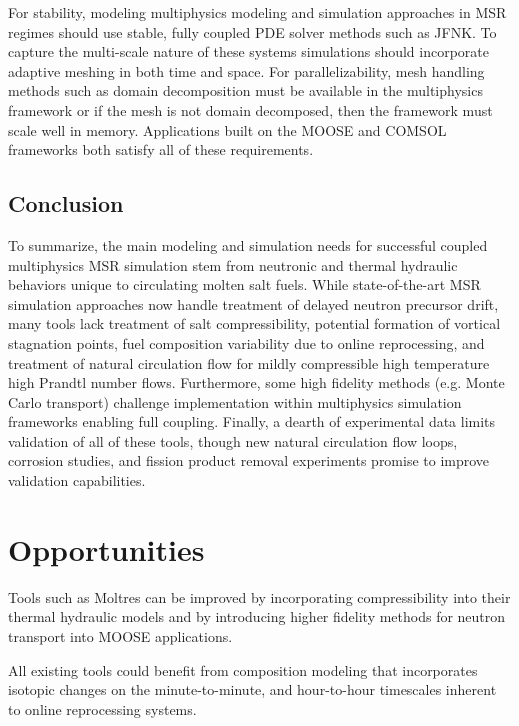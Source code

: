 For stability, modeling multiphysics modeling and simulation approaches in 
\gls{MSR} regimes should use stable, fully coupled 
\gls{PDE} solver methods such as \gls{JFNK}. To capture the multi-scale nature 
of these systems simulations should incorporate adaptive meshing in 
both time and space.
For parallelizability, mesh handling methods such as domain decomposition must 
be available in the multiphysics framework or if the mesh is not domain 
decomposed, then the framework must scale well in memory. 
Applications built on the \gls{MOOSE} and \gls{COMSOL} frameworks both satisfy all 
of these requirements.  

\subsection{Conclusion}
To summarize, the main modeling and simulation needs for successful 
coupled multiphysics \gls{MSR} simulation stem from neutronic and thermal 
hydraulic behaviors unique to circulating molten salt fuels. While state-of-the-art \gls{MSR} 
simulation approaches now handle treatment of delayed neutron precursor drift, 
many tools lack treatment of salt compressibility, potential formation of vortical 
stagnation points, fuel composition variability due to online reprocessing, and treatment of natural circulation 
flow for mildly compressible high temperature high Prandtl number flows. 
Furthermore, some high fidelity methods (e.g. Monte Carlo transport) challenge 
implementation within multiphysics 
simulation frameworks enabling full coupling. Finally, a dearth of experimental data limits 
validation of all of these tools, though new natural circulation flow loops, 
corrosion studies, and fission product removal experiments promise to improve 
validation capabilities.

\section{Opportunities}

Tools such as Moltres \cite{lindsay_introduction_2018} can be improved by 
incorporating compressibility into their thermal hydraulic models and by 
introducing higher fidelity methods for neutron transport into \gls{MOOSE} 
applications. 

All existing tools could benefit from composition modeling that incorporates 
isotopic changes on the minute-to-minute, and hour-to-hour timescales inherent 
to online reprocessing systems. 

